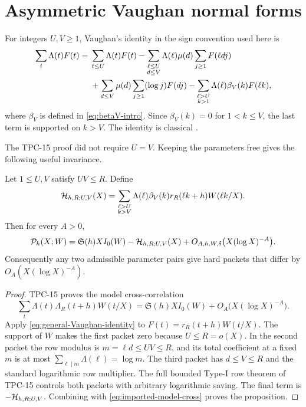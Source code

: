 \section{Asymmetric Vaughan normal forms}
\label{sec:asymmetric-vaughan}

For integers $U,V\ge1$, Vaughan's identity in the sign convention used
here is
\begin{align}
 \sum_t\Lambda(t)F(t)
 ={}&\sum_{t\le U}\Lambda(t)F(t)
 -\sum_{\substack{\ell\le U\\d\le V}}
 \Lambda(\ell)\mu(d)\sum_{j\ge1}F(\ell dj)
 \notag\\
 &+\sum_{d\le V}\mu(d)
 \sum_{j\ge1}(\log j)F(dj)
 -\sum_{\substack{\ell>U\\k>1}}
 \Lambda(\ell)\beta_V(k)F(\ell k),
 \label{eq:general-Vaughan-identity}
\end{align}
where $\beta_V$ is defined in \eqref{eq:betaV-intro}.  Since
$\beta_V(k)=0$ for $1<k\le V$, the last term is supported on $k>V$.
The identity is classical \citep{Vaughan1977,HeathBrown1982}.

The TPC-15 proof did not require $U=V$.  Keeping the parameters free gives
the following useful invariance.

\begin{proposition}
\label{prop:Vaughan-parameter-invariance}
Let $1\le U,V$ satisfy $UV\le R$.  Define
\begin{equation}
 \mathcal H_{h,R;U,V}(X)=
 \sum_{\substack{\ell>U\\k>V}}
 \Lambda(\ell)\beta_V(k)r_R(\ell k+h)W(\ell k/X).
 \label{eq:general-hard-packet}
\end{equation}
Then for every $A>0$,
\begin{equation}
 \mathcal P_h(X;W)=\mathfrak S(h)XI_0(W)
 -\mathcal H_{h,R;U,V}(X)
 +O_{A,h,W,\delta}\bigl(X(\log X)^{-A}\bigr).
 \label{eq:general-parameter-reduction}
\end{equation}
Consequently any two admissible parameter pairs give hard packets that
differ by $O_A(X(\log X)^{-A})$.
\end{proposition}

\begin{proof}
TPC-15 proves the model cross-correlation
\begin{equation}
 \sum_t\Lambda(t)\Lambda_R(t+h)W(t/X)
 =\mathfrak S(h)XI_0(W)
 +O_A\bigl(X(\log X)^{-A}\bigr).
 \label{eq:imported-model-cross}
\end{equation}
Apply \eqref{eq:general-Vaughan-identity} to
$F(t)=r_R(t+h)W(t/X)$.  The support of $W$ makes the first packet zero
because $U\le R=o(X)$.  In the second packet the row modulus is
$m=\ell d\le UV\le R$, and its total coefficient at a fixed $m$ is at
most $\sum_{\ell\mid m}\Lambda(\ell)=\log m$.  The third packet has
$d\le V\le R$ and the standard logarithmic row multiplier.  The full
bounded Type-I row theorem of TPC-15 controls both packets with arbitrary
logarithmic saving.  The final term is
$-\mathcal H_{h,R;U,V}$.  Combining with \eqref{eq:imported-model-cross} proves
the proposition.
\end{proof}

